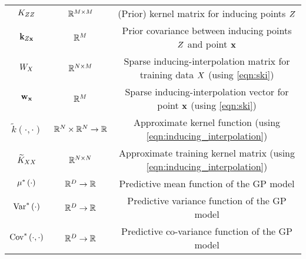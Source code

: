 \begin{table}[!b]
{\begin{tabular}{ ccc }
			$K_{ZZ}$ & $\mathbb{R}^{M \times M}$ & (Prior) kernel matrix for inducing points $Z$ \\
			$\mathbf{k}_{Z\mathbf{x}}$ & $\mathbb{R}^{M}$ & Prior covariance between inducing points $Z$ and point $\mathbf{x}$ \\
			$W_{X}$ & $\mathbb{R}^{N \times M}$ & Sparse inducing-interpolation matrix for training data $X$ (using \cref{eqn:ski}) \\
			$\mathbf{w}_{\mathbf{x}}$ & $\mathbb{R}^{M}$ & Sparse inducing-interpolation vector for point $\mathbf{x}$ (using \cref{eqn:ski}) \\
			\midrule
			$\widetilde k(\cdot, \cdot)$ & $\mathbb{R}^{N} \times \mathbb{R}^{N} \rightarrow \mathbb{R}$ & Approximate kernel function (using \cref{eqn:inducing_interpolation}) \\
			$\widetilde {K}_{XX}$ & $\mathbb{R}^{N \times N}$ & Approximate training kernel matrix (using \cref{eqn:inducing_interpolation}) \\
			\midrule
			$\mu^* \left(  \cdot  \right)$ & $\mathbb{R}^{D} \rightarrow \mathbb{R}$ & Predictive mean function of the GP model \\
			$\text{Var}^* \left(  \cdot  \right)$ & $\mathbb{R}^{D} \rightarrow \mathbb{R}$ & Predictive variance function of the GP model\\
      $\text{Cov}^* \left(  \cdot ,  \cdot  \right)$ & $\mathbb{R}^{D} \rightarrow \mathbb{R}$ & Predictive co-variance function of the GP model\\
			\bottomrule
		\end{tabular}
	}
\end{table}

\clearpage
